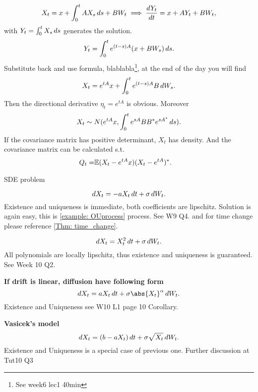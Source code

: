 \begin{align*}
    X_t = x + \int_0^t A X_s \mathop{}\!d s+ B W_t \implies \frac{\mathop{}\!d Y_t}{\mathop{}\!d t} = x + A Y_t+ B W_t,
\end{align*} with $Y_t = \int_0^t X_s \mathop{}\!d s$ generates the solution.
\begin{equation*}
    Y_t = \int_0^t e^{(t-s)A} (x+ BW_s) \mathop{}\!d s.
\end{equation*}
Substitute back and use \ito formula, blablabla\footnote{See week6 lec1 40min}, at the end of the day you will find
\begin{equation*}
    X_t = e^{tA}x + \int_0^t e^{(t-s)A}B \mathop{}\!d W_s.
\end{equation*}
Then the directional derivative $\eta_t = e^{tA}$ is obvious. Moreover
\begin{equation*}
    X_t \sim N(e^{tA}x, \int_0^t e^{sA} BB^* e^{sA^*} \mathop{}\!d s).
\end{equation*}
If the covariance matrix has positive determinant, $X_t$ has density. And the covariance matrix can be calculated s.t.
\begin{align*}
    Q_t =& \mathbb{E}(X_t - e^{tA}x)(X_t - e^{tA})^*.
\end{align*}

\newpage
SDE problem

\begin{equation*}
    \mathop{}\!d X_t = -a X_t \mathop{}\!d t + \sigma \mathop{}\!d W_t.
\end{equation*}
Existence and uniqueness is immediate, both coefficients are lipschitz. Solution is again easy, this is \ref{example: OUprocess} process. See W9 Q4. and for time change please reference \ref{Thm: time_change}.

\vspace{2cm}
\begin{equation*}
    \mathop{}\!d X_t = X_t^2 \mathop{}\!d t + \sigma \mathop{}\!d W_t.
\end{equation*}
All polynomials are locally lipschitz, thus existence and uniqueness is guaranteed. See Week 10 Q2.

\vspace{2cm}
\textbf{If drift is linear, diffusion have following form}
\begin{equation*}
    \diff X_t = a X_t \diff t + \sigma \abs{X_t}^\alpha \diff W_t.
\end{equation*}
Existence and Uniqueness see W10 L1 page 10 Corollary.

\vspace{2cm}
\textbf{Vasicek's model}
\begin{equation*}
    \mathop{}\!d X_t = (b- a X_t) \mathop{}\!d t + \sigma \sqrt{X_t} \mathop{}\!d W_t.
\end{equation*}
Existence and Uniqueness is a special case of previous one. Further discussion at Tut10 Q3

